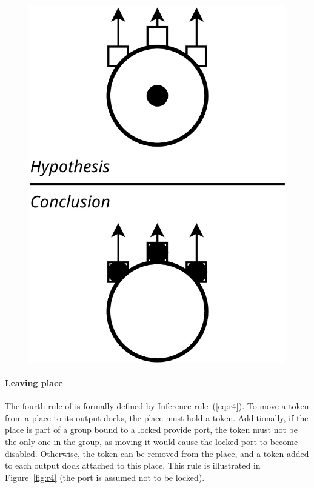 {\begin{figure}[t]
\begin{minipage}[h]{0.45\columnwidth}
  \includegraphics[width=0.65\columnwidth]{./images/place_to_outputdocks.pdf}
\end{minipage}
\end{figure}

\paragraph{Leaving place}{

The fourth rule of \mad is formally defined by Inference
rule~(\ref{eq:r4}). To move a token from a place to its output docks,
the place must hold a token. Additionally, if the place is part of a
group bound to a locked provide port, the token must not be the only
one in the group, as moving it would cause the locked port to become
disabled. Otherwise, the token can be removed from the place, and a
token added to each output dock attached to this place. This rule is
illustrated in Figure~\ref{fig:r4} (the port is assumed not to be
locked).

}

}
